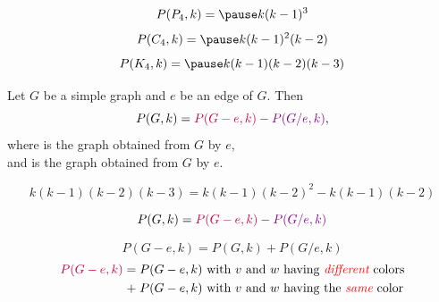 
\begin{frame}{}
	\begin{center}


		\pause
		\[
			P(P_{4}, k) = \pause k(k-1)^3
		\]
		\pause
		\[
			P(C_4, k) = \pause k(k-1)^2(k-2)
		\]
		\pause
		\[
			P(K_4, k) = \pause k(k-1)(k-2)(k-3)
		\]
	\end{center}
\end{frame}

\begin{frame}{}
	\begin{theorem}
		Let $G$ be a simple graph and $e$ be an edge of $G$. Then
		\[
			P(G, k) = \textcolor{purple}{P(G - e, k)} - \textcolor{violet}{P(G / e, k)},
		\]
		where  is the graph obtained from $G$ by  $e$, \\
		and  is the graph obtained from $G$ by  $e$.
	\end{theorem}

	\pause
	\pause
	\[
		k(k-1)(k-2)(k-3) = k(k-1)(k-2)^{2} - k(k-1)(k-2)
	\]
\end{frame}

\begin{frame}{}
	\begin{theorem}
		\[
			P(G, k) = \textcolor{purple}{P(G - e, k)} - \textcolor{violet}{P(G / e, k)}
		\]
	\end{theorem}


	\pause
	\[
		P(G - e, k) =  P(G, k) + P(G / e, k)
	\]
	\pause
	\vspace{-0.30cm}
	\begin{align*}
		\textcolor{purple}{P(G - e, k)} =\; &P(G - e, k) \text{ with $v$ and $w$ having \textcolor{red}{\it different} colors} \\
		  +\; &P(G - e, k) \text{ with $v$ and $w$ having the \textcolor{red}{\it same} color}
	\end{align*}
\end{frame}

